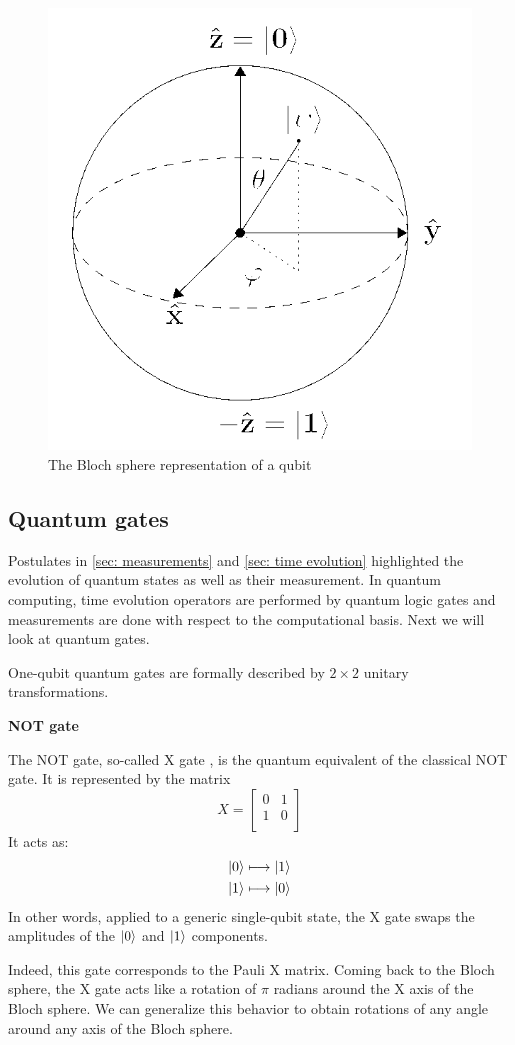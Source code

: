 \begin{figure}
    \centering
    \includegraphics[width=0.5\linewidth]{img/img-ch2/bloch-sphere.png}
    \caption{The Bloch sphere representation of a qubit}
    \label{fig:bloch-sphere}
\end{figure}

\subsection{Quantum gates}
Postulates in \autoref{sec: measurements} and \autoref{sec: time evolution} highlighted the evolution of quantum states as well as their measurement. In quantum computing, time evolution operators are performed by quantum logic gates and measurements are done with respect to the computational basis. Next we will look at quantum gates. 

One-qubit quantum gates are formally described by $2 \times 2$ unitary transformations. 

\textbf{NOT gate}

The NOT gate, so-called X gate , is the quantum equivalent of the classical NOT gate. 
It is represented by the matrix
$$ X = \begin{bmatrix}
        0&1\\
        1&0\\
        \end{bmatrix} $$
It acts as:
\begin{align}
    \ket{0} &\longmapsto \ket{1} \\
    \ket{1} &\longmapsto \ket{0}
\end{align}
In other words, applied to a generic single-qubit state, the X gate swaps the amplitudes of the $\ket{0}$ and $\ket{1}$ components. 

Indeed, this gate corresponds to the Pauli X matrix. Coming back to the Bloch sphere, the X gate acts like a rotation of $\pi$ radians around the X axis of the Bloch sphere. We can generalize this behavior to obtain rotations of any angle around any axis of the Bloch sphere.

